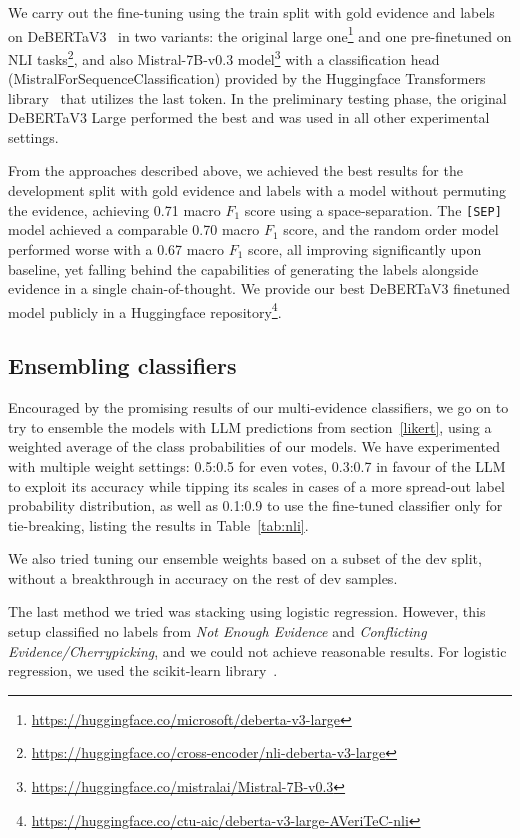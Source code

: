 We carry out the fine-tuning using the \averitec{} train split with gold evidence and labels on DeBERTaV3~\cite{he2023debertav3improvingdebertausing} in two variants: the original large one\footnote{\url{https://huggingface.co/microsoft/deberta-v3-large}} and one pre-finetuned on NLI tasks\footnote{\url{https://huggingface.co/cross-encoder/nli-deberta-v3-large}}, and also Mistral-7B-v0.3 model\footnote{\url{https://huggingface.co/mistralai/Mistral-7B-v0.3}} with a classification head (MistralForSequenceClassification) provided by the Huggingface Transformers library~\cite{wolf-etal-2020-transformers} that utilizes the last token. In the preliminary testing phase, the original DeBERTaV3 Large performed the best and was used in all other experimental settings.

From the approaches described above, we achieved the best results for the development split with gold evidence and labels with a model without permuting the evidence, achieving 0.71 macro $F_1$ score using a space-separation. The \texttt{[SEP]} model achieved a comparable 0.70 macro $F_1$ score, and the random order model performed worse with a 0.67 macro $F_1$ score, all improving significantly upon baseline, yet falling behind the capabilities of generating the labels alongside evidence in a single chain-of-thought. 
We provide our best DeBERTaV3 finetuned model publicly in a Huggingface repository\footnote{\url{https://huggingface.co/ctu-aic/deberta-v3-large-AVeriTeC-nli}}.

\subsection{Ensembling classifiers}
\label{subsubsec:ensembling}

Encouraged by the promising results of our multi-evidence classifiers, we go on to try to ensemble the models with LLM predictions from section~\ref{likert}, using a weighted average of the class probabilities of our models.
We have experimented with multiple weight settings: 0.5:0.5 for even votes, 0.3:0.7 in favour of the LLM to exploit its accuracy while tipping its scales in cases of a more spread-out label probability distribution, as well as 0.1:0.9 to use the fine-tuned classifier only for tie-breaking, listing the results in Table~\ref{tab:nli}.

We also tried tuning our ensemble weights based on a subset of the dev split, without a breakthrough in accuracy on the rest of dev samples.

The last method we tried was stacking using logistic regression. However, this setup classified no labels from \textit{Not Enough Evidence} and \textit{Conflicting Evidence/Cherrypicking}, and we could not achieve reasonable results. For logistic regression, we used the scikit-learn library~\cite{scikit-learn}.

